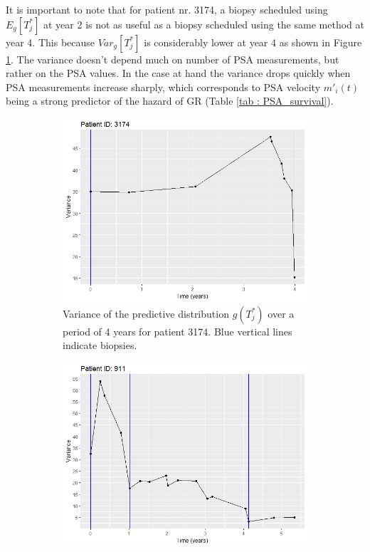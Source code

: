 It is important to note that for patient nr. 3174, a biopsy scheduled using $E_g[T^*_j]$ at year 2 is not as useful as a biopsy scheduled using the same method at year 4. This because $Var_g[T^*_j]$ is considerably lower at year 4 as shown in Figure \ref{fig : variance_pred_dist_3174}. The variance doesn't depend much on number of PSA measurements, but rather on the PSA values. In the case at hand the variance drops quickly when PSA measurements increase sharply, which corresponds to PSA velocity $m'_i(t)$ being a strong predictor of the hazard of GR (Table \ref{tab : PSA_survival}).\\

\begin{figure}[!htb]
    \centering
    \captionsetup{justification=centering}
     \begin{subfigure}[b]{0.45\textwidth}
        \includegraphics[width=\textwidth]{images/variance/variance_pred_dist_3174.png}
        \caption{Variance of the predictive distribution $g(T^*_j)$ over a period of 4 years for patient 3174. Blue vertical lines indicate biopsies.}
        \label{fig : variance_pred_dist_3174}
    \end{subfigure}
    \begin{subfigure}[b]{0.45\textwidth}
        \includegraphics[width=\textwidth]{images/variance/variance_pred_dist_911.png}

\end{subfigure}
\end{figure}
